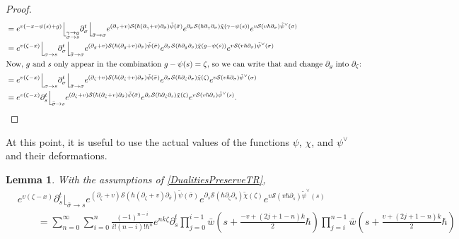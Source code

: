 \documentclass[10pt,a4paper,oneside,no-math,reqno]{amsart}%
\theoremstyle{plain}
\newtheorem{lemma}[theorem]{Lemma}
\theoremstyle{definition}
\theoremstyle{remark}
\numberwithin{equation}{section}
\newcommand{\mc}[1]{\mathcal{#1}}
\newcommand{\1}{\mathds{1}}
\newcommand{\<}{\langle}
\renewcommand{\>}{\rangle}
\newcommand{\del}{\partial}
\begin{document}
\begin{proof}
\begin{align*}
			&=
			e^{v (-x - \psi (s) + g)}
			\Big\lfloor_{\substack{\gamma \to g \\ \sigma \to s}}
			\del_\sigma^t 
			\Big\lfloor_{\bar{\sigma} \to \sigma}
			e^{ (\del_\gamma+v) \mc{S}( \hbar (\del_\gamma + v) \del_{\bar{\sigma}} )\tilde{\psi} (\bar{\sigma}) }
			e^{ \del_\sigma \mc{S}( \hbar \del_\gamma \del_\sigma)\tilde{\chi} (\gamma - \psi (s)) }
			e^{v \mc{S}(v \hbar \del_\sigma) \tilde{\psi}^\vee ( \sigma)}
			\\
			&=
			e^{v (\zeta - x)}
			\Big\lfloor_{\sigma \to s}
			\del_\sigma^t \Big\lfloor_{\bar{\sigma} \to \sigma}
			e^{ (\del_g+v) \mc{S}( \hbar (\del_g + v) \del_{\bar{\sigma}} )\tilde{\psi} (\bar{\sigma}) }
			e^{ \del_\sigma \mc{S}( \hbar \del_g \del_\sigma ) \tilde{\chi} (g - \psi (s)) }
			e^{v \mc{S}(v \hbar \del_\sigma) \tilde{\psi}^\vee (\sigma)} 
			\\
			\intertext{Now, $ g$ and $ s$ only appear in the combination $ g - \psi (s) = \zeta$, so we can write that and change $ \del_g$ into $ \del_\zeta$:}
			&=
			e^{v (\zeta - x)}
			\Big\lfloor_{\sigma \to s}
			\del_\sigma^t \Big\lfloor_{\bar{\sigma} \to \sigma}
			e^{ (\del_\zeta+v) \mc{S}( \hbar (\del_\zeta + v) \del_{\bar{\sigma}} )\tilde{\psi} (\bar{\sigma}) }
			e^{ \del_\sigma \mc{S}( \hbar \del_\zeta \del_\sigma ) \tilde{\chi} (\zeta ) }
			e^{v \mc{S}(v \hbar \del_\sigma) \tilde{\psi}^\vee (\sigma)} 
			\\
			&=
			e^{v (\zeta - x)}
			\del_s^t \Big\lfloor_{\bar{\sigma} \to s}
			e^{ (\del_\zeta+v) \mc{S}( \hbar (\del_\zeta + v) \del_{\bar{\sigma}} )\tilde{\psi} (\bar{\sigma}) }
			e^{ \del_s \mc{S}( \hbar \del_\zeta \del_s ) \tilde{\chi} (\zeta ) }
			e^{v \mc{S}(v \hbar \del_s) \tilde{\psi}^\vee (s)} .
			\qedhere
	\end{align*}
\end{proof}

At this point, it is useful to use the actual values of the functions $ \psi$, $ \chi$, and $ \psi^\vee$ and their deformations.

\begin{lemma}\label{ExplicitDualityChain}
	With the assumptions of \cref{DualitiesPreserveTR},
	\begin{equation}
		\begin{split}
			&e^{v (\zeta - x)}
			\del_s^t \Big\lfloor_{\bar{\sigma} \to s}
			e^{ (\del_\zeta+v) \mc{S}( \hbar (\del_\zeta + v) \del_{\bar{\sigma}} )\tilde{\psi} (\bar{\sigma}) }
			e^{ \del_s \mc{S}( \hbar \del_\zeta \del_s ) \tilde{\chi} (\zeta ) }
			e^{v \mc{S}(v \hbar \del_s) \tilde{\psi}^\vee (s)}
			\\
			&\qquad=
			\sum_{n=0}^\infty \sum_{i = 0}^n \frac{(-1)^{n-i} }{i!(n-i)! \hbar^n } e^{ nk \zeta}
			\del_s^t
			\prod_{j = 0}^{i-1} \bar{w} ( s + \frac{-v+ (2j+1-n) k}{2} \hbar)
			\prod_{j = i}^{n-1} \bar{w} ( s + \frac{ v+ (2j+1-n) k}{2} \hbar)
		\end{split}
	\end{equation}
\end{lemma}
\end{document}
